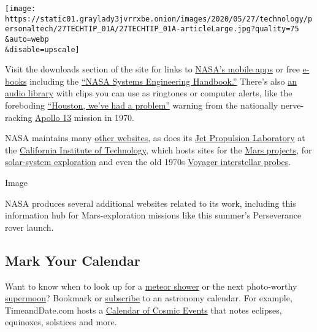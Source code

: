 \texttt{[image: https://static01.graylady3jvrrxbe.onion/images/2020/05/27/technology/personaltech/27TECHTIP\_01A/27TECHTIP\_01A-articleLarge.jpg?quality=75\\\&auto=webp\\\&disable=upscale]}

Visit the downloads section of the site for links to
\href{https://www.nasa.gov/connect/apps.html}{NASA's mobile apps} or
free \href{https://www.nasa.gov/connect/ebooks/index.html}{e-books}
including the
\href{https://www.nasa.gov/connect/ebooks/nasa-systems-engineering-handbook}{``NASA
Systems Engineering Handbook.''} There's also
\href{https://www.nasa.gov/connect/sounds/index.html}{an audio library}
with clips you can use as ringtones or computer alerts, like the
foreboding
\href{https://www.nasa.gov/mp3/574928main_houston_problem.mp3}{``Houston,
we've had a problem''} warning from the nationally nerve-racking
\href{https://www.nasa.gov/feature/50-years-ago-houston-we-ve-had-a-problem}{Apollo
13} mission in 1970.

NASA maintains many
\href{https://www.nasa.gov/audience/foreducators/Alpha_index.html}{other
websites}, as does its \href{https://www.jpl.nasa.gov/}{Jet Propulsion
Laboratory} at the \href{https://www.caltech.edu/}{California Institute
of Technology}, which hosts sites for the
\href{https://mars.nasa.gov/}{Mars projects}, for
\href{https://solarsystem.nasa.gov/}{solar-system exploration} and even
the old 1970s \href{https://voyager.jpl.nasa.gov/}{Voyager interstellar
probes}.

Image

NASA produces several additional websites related to its work, including
this information hub for Mars-exploration missions like this summer's
Perseverance rover launch.

\hypertarget{mark-your-calendar}{%
\subsection{Mark Your Calendar}\label{mark-your-calendar}}

Want to know when to look up for a
\href{https://www.amsmeteors.org/meteor-showers/meteor-shower-calendar/}{meteor
shower} or the next photo-worthy
\href{https://solarsystem.nasa.gov/news/1220/the-next-full-moon-is-a-supermoon-flower-moon/}{supermoon}?
Bookmark or
\href{https://www.nytimes3xbfgragh.onion/2014/12/26/technology/personaltech/adding-the-sun-moon-and-stars-to-google-calendar.html}{subscribe}
to an astronomy calendar. For example, TimeandDate.com hosts a
\href{https://www.timeanddate.com/astronomy/sights-to-see.html}{Calendar
of Cosmic Events} that notes eclipses, equinoxes, solstices and more.

